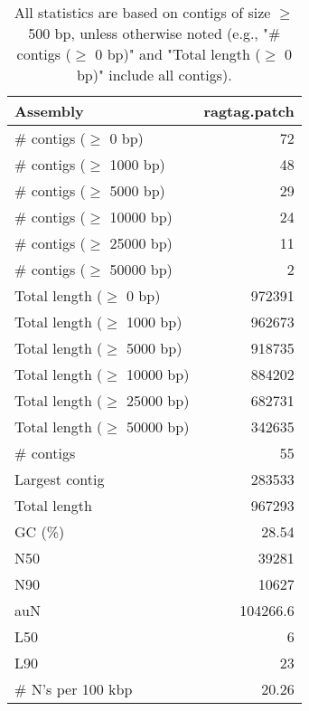 \documentclass[12pt,a4paper]{article}
\begin{document}
\begin{table}[ht]
\begin{center}
\caption{All statistics are based on contigs of size $\geq$ 500 bp, unless otherwise noted (e.g., "\# contigs ($\geq$ 0 bp)" and "Total length ($\geq$ 0 bp)" include all contigs).}
\begin{tabular}{|l*{1}{|r}|}
\hline
Assembly & ragtag.patch \\ \hline
\# contigs ($\geq$ 0 bp) & 72 \\ \hline
\# contigs ($\geq$ 1000 bp) & 48 \\ \hline
\# contigs ($\geq$ 5000 bp) & 29 \\ \hline
\# contigs ($\geq$ 10000 bp) & 24 \\ \hline
\# contigs ($\geq$ 25000 bp) & 11 \\ \hline
\# contigs ($\geq$ 50000 bp) & 2 \\ \hline
Total length ($\geq$ 0 bp) & 972391 \\ \hline
Total length ($\geq$ 1000 bp) & 962673 \\ \hline
Total length ($\geq$ 5000 bp) & 918735 \\ \hline
Total length ($\geq$ 10000 bp) & 884202 \\ \hline
Total length ($\geq$ 25000 bp) & 682731 \\ \hline
Total length ($\geq$ 50000 bp) & 342635 \\ \hline
\# contigs & 55 \\ \hline
Largest contig & 283533 \\ \hline
Total length & 967293 \\ \hline
GC (\%) & 28.54 \\ \hline
N50 & 39281 \\ \hline
N90 & 10627 \\ \hline
auN & 104266.6 \\ \hline
L50 & 6 \\ \hline
L90 & 23 \\ \hline
\# N's per 100 kbp & 20.26 \\ \hline
\end{tabular}
\end{center}
\end{table}
\end{document}

